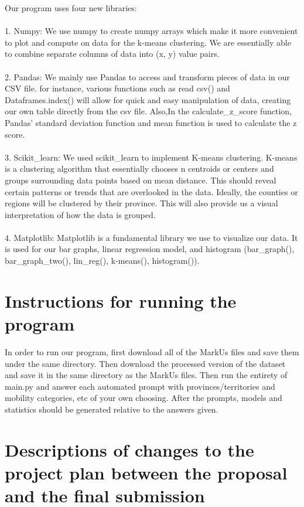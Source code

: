 \documentclass[fontsize=11pt]{article}
\begin{document}
    Our program uses four new libraries:\\\\
    1. Numpy: We use numpy to create numpy arrays which make it more convenient to plot and compute on data for the k-means clustering. We are essentially able to combine separate columns of data into (x, y) value pairs.\\\\
    2. Pandas: We mainly use Pandas to access and transform pieces of data in our CSV file. for instance,  various functions such as read csv()  and Dataframes.index() will allow for quick and easy manipulation of data, creating our own table directly from the csv file. Also,In the calculate\_z\_score function, Pandas’ standard deviation function and mean function is used to calculate the z score.\\\\
    3. Scikit\_learn: We used scikit\_learn to implement K-means clustering. K-means is a clustering algorithm that essentially chooses n centroids or centers and groups surrounding data points based on mean distance. This should reveal certain patterns or trends that are overlooked in the data. Ideally, the counties or regions will be clustered by their province. This will also provide us a visual interpretation of how the data is grouped. \\\\
    4. Matplotlib: Matplotlib is a fundamental library we use to visualize our data. It is used for our bar graphs, linear regression model, and histogram (bar\_graph(), bar\_graph\_two(), lin\_reg(), k-means(), histogram()).

    \section*{Instructions for running the program}

    \indent In order to run our program, first download all of the MarkUs files and save them under the same directory. Then download the processed version of the dataset and save it in the same directory as the MarkUs files. Then run the entirety of main.py and answer each automated prompt with provinces/territories and mobility categories, etc of your own choosing. After the prompts, models and statistics should be generated relative to the answers given.

    \section*{Descriptions of changes to the project plan between the proposal and the final submission}
\end{document}
